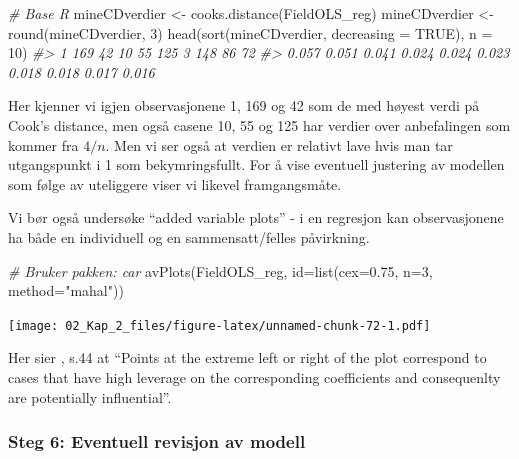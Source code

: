 \documentclass[
]{article}
\newenvironment{Shaded}{\begin{snugshade}}{\end{snugshade}}
\newcommand{\AttributeTok}[1]{\textcolor[rgb]{0.77,0.63,0.00}{#1}}
\newcommand{\CommentTok}[1]{\textcolor[rgb]{0.56,0.35,0.01}{\textit{#1}}}
\newcommand{\ConstantTok}[1]{\textcolor[rgb]{0.00,0.00,0.00}{#1}}
\newcommand{\DecValTok}[1]{\textcolor[rgb]{0.00,0.00,0.81}{#1}}
\newcommand{\FloatTok}[1]{\textcolor[rgb]{0.00,0.00,0.81}{#1}}
\newcommand{\FunctionTok}[1]{\textcolor[rgb]{0.00,0.00,0.00}{#1}}
\newcommand{\NormalTok}[1]{#1}
\newcommand{\OtherTok}[1]{\textcolor[rgb]{0.56,0.35,0.01}{#1}}
\newcommand{\StringTok}[1]{\textcolor[rgb]{0.31,0.60,0.02}{#1}}
\begin{document}
\begin{Shaded}
\begin{Highlighting}[]
\CommentTok{\# Base R}
\NormalTok{mineCDverdier }\OtherTok{\textless{}{-}} \FunctionTok{cooks.distance}\NormalTok{(FieldOLS\_reg)}
\NormalTok{mineCDverdier }\OtherTok{\textless{}{-}} \FunctionTok{round}\NormalTok{(mineCDverdier, }\DecValTok{3}\NormalTok{)}
\FunctionTok{head}\NormalTok{(}\FunctionTok{sort}\NormalTok{(mineCDverdier, }\AttributeTok{decreasing =} \ConstantTok{TRUE}\NormalTok{), }\AttributeTok{n =} \DecValTok{10}\NormalTok{)}
\CommentTok{\#\textgreater{}     1   169    42    10    55   125     3   148    86    72 }
\CommentTok{\#\textgreater{} 0.057 0.051 0.041 0.024 0.024 0.023 0.018 0.018 0.017 0.016}
\end{Highlighting}
\end{Shaded}

Her kjenner vi igjen observasjonene 1, 169 og 42 som de med høyest verdi på Cook's distance, men også casene 10, 55 og 125 har verdier over anbefalingen som kommer fra \(4/n\). Men vi ser også at verdien er relativt lave hvis man tar utgangspunkt i 1 som bekymringsfullt. For å vise eventuell justering av modellen som følge av uteliggere viser vi likevel framgangsmåte.

Vi bør også undersøke ``added variable plots'' - i en regresjon kan observasjonene ha både en individuell og en sammensatt/felles påvirkning.

\begin{Shaded}
\begin{Highlighting}[]
\CommentTok{\# Bruker pakken: car}
\FunctionTok{avPlots}\NormalTok{(FieldOLS\_reg, }\AttributeTok{id=}\FunctionTok{list}\NormalTok{(}\AttributeTok{cex=}\FloatTok{0.75}\NormalTok{, }\AttributeTok{n=}\DecValTok{3}\NormalTok{, }\AttributeTok{method=}\StringTok{"mahal"}\NormalTok{))}
\end{Highlighting}
\end{Shaded}

\texttt{[image: 02\_Kap\_2\_files/figure-latex/unnamed-chunk-72-1.pdf]}

Her sier \citet{foxCompanionAppliedRegression2019}, s.44 at ``Points at the extreme left or right of the plot correspond to cases that have high leverage on the corresponding coefficients and consequenlty are potentially influential''.

\hypertarget{steg-6-eventuell-revisjon-av-modell}{%
\subsubsection{Steg 6: Eventuell revisjon av modell}\label{steg-6-eventuell-revisjon-av-modell}}
\end{document}
